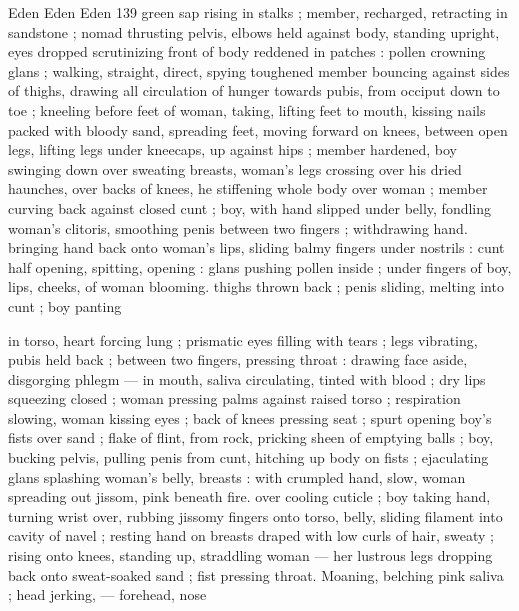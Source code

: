 Eden Eden Eden 139
green sap rising in stalks ; member, recharged, retracting in
sandstone ; nomad thrusting pelvis, elbows held against body,
standing upright, eyes dropped scrutinizing front of body reddened
in patches : pollen crowning glans ; walking, straight, direct, spying
toughened member bouncing against sides of thighs, drawing all
circulation of hunger towards pubis, from occiput down to toe ;
kneeling before feet of woman, taking, lifting feet to mouth, kissing
nails packed with bloody sand, spreading feet, moving forward on
knees, between open legs, lifting legs under kneecaps, up against
hips ; member hardened, boy swinging down over sweating breasts,
woman's legs crossing over his dried haunches, over backs of knees,
he stiffening whole body over woman ; member curving back against
closed cunt ; boy, with hand slipped under belly, fondling woman's
clitoris, smoothing penis between two fingers ; withdrawing hand.
bringing hand back onto woman's lips, sliding balmy fingers under
nostrils : cunt half opening, spitting, opening : glans pushing pollen
inside ; under fingers of boy, lips, cheeks, of woman blooming.
thighs thrown back ; penis sliding, melting into cunt ; boy panting

in torso, heart forcing lung ; prismatic eyes filling with tears ; legs
vibrating, pubis held back ; between two fingers, pressing throat :
drawing face aside, disgorging phlegm — in mouth, saliva
circulating, tinted with blood ; dry lips squeezing closed ; woman
pressing palms against raised torso ; respiration slowing, woman
kissing eyes ; back of knees pressing seat ; spurt opening boy's fists
over sand ; flake of flint, from rock, pricking sheen of emptying balls
; boy, bucking pelvis, pulling penis from cunt, hitching up body on
fists ; ejaculating glans splashing woman's belly, breasts : with
crumpled hand, slow, woman spreading out jissom, pink beneath fire.
over cooling cuticle ; boy taking hand, turning wrist over, rubbing
jissomy fingers onto torso, belly, sliding filament into cavity of navel
; resting hand on breasts draped with low curls of hair, sweaty ; rising
onto knees, standing up, straddling woman — her lustrous legs
dropping back onto sweat-soaked sand ; fist pressing throat.
Moaning, belching pink saliva ; head jerking, — forehead, nose

